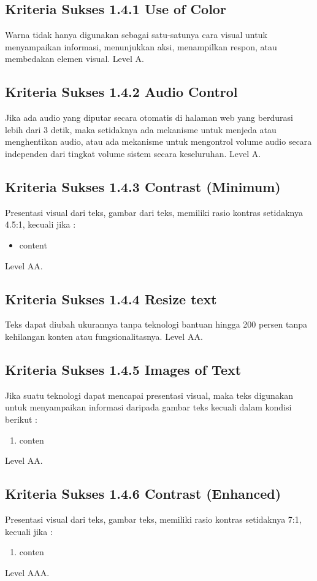 \subsection{Kriteria Sukses 1.4.1 Use of Color}
\label{sec:kriteria_1.4.1}
Warna tidak hanya digunakan sebagai satu-satunya cara visual untuk menyampaikan informasi, menunjukkan aksi, menampilkan respon, atau membedakan elemen visual.
Level A.

\subsection{Kriteria Sukses 1.4.2 Audio Control}
\label{sec:kriteria_1.4.2}
Jika ada audio yang diputar secara otomatis di halaman web yang berdurasi lebih dari 3 detik, maka setidaknya ada mekanisme untuk menjeda atau menghentikan audio, atau ada mekanisme untuk mengontrol volume audio secara independen dari tingkat volume sistem secara keseluruhan.
Level A.

\subsection{Kriteria Sukses 1.4.3 Contrast (Minimum)}
\label{sec:kriteria_1.4.3}
Presentasi visual dari teks, gambar dari teks, memiliki rasio kontras setidaknya 4.5:1, kecuali jika :
\begin{itemize}
	\item content
\end{itemize}
Level AA.

\subsection{Kriteria Sukses 1.4.4 Resize text}
\label{sec:kriteria_1.4.4}
Teks dapat diubah ukurannya tanpa teknologi bantuan hingga 200 persen tanpa kehilangan konten atau fungsionalitasnya.
Level AA.

\subsection{Kriteria Sukses 1.4.5 Images of Text}
\label{sec:kriteria_1.4.5}
Jika suatu teknologi dapat mencapai presentasi visual, maka teks digunakan untuk menyampaikan informasi daripada gambar teks kecuali dalam kondisi berikut :
\begin{enumerate}
	\item conten
\end{enumerate}
Level AA.

\subsection{Kriteria Sukses 1.4.6 Contrast (Enhanced)}
\label{sec:kriteria_1.4.6}
Presentasi visual dari teks, gambar teks, memiliki rasio kontras setidaknya 7:1, kecuali jika :
\begin{enumerate}
	\item conten
\end{enumerate}
Level AAA.


